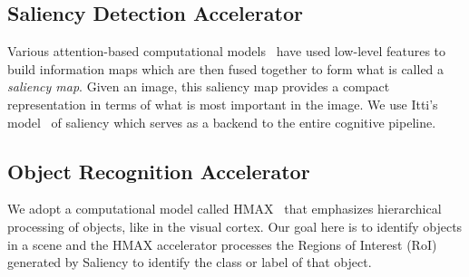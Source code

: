 
\subsection{Saliency Detection Accelerator}
Various attention-based computational models~\cite{Itti2001,Bruce2009a} have used low-level features to build information maps which are then fused together to form what is called a \emph{saliency map}. Given an image, this saliency map provides a compact representation in terms of what is most important in the image. 
We use Itti's model~\cite{Peters2007} of saliency which serves as a backend to the entire cognitive pipeline. 

\subsection{Object Recognition Accelerator}

We adopt a computational model called HMAX~\cite{Mutch2008} that emphasizes hierarchical processing of objects, like in the visual cortex. Our goal here is to identify objects in a scene and the HMAX accelerator processes the Regions of Interest (RoI) generated by Saliency to identify the class or label of that object. 

